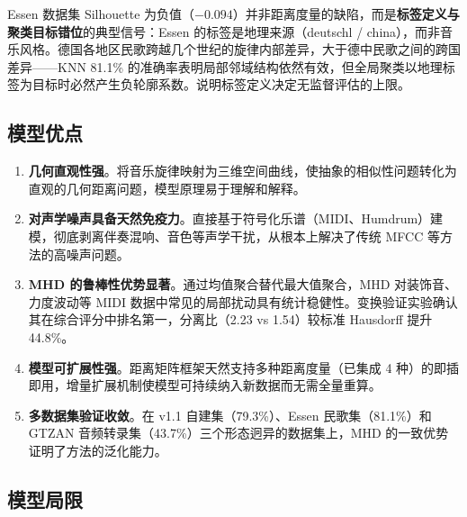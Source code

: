 \documentclass[withoutpreface]{cumcmthesis}
\begin{document}
Essen 数据集 Silhouette 为负值（$-0.094$）并非距离度量的缺陷，而是\textbf{标签定义与聚类目标错位}的典型信号：Essen 的标签是地理来源（deutschl / china），而非音乐风格。德国各地区民歌跨越几个世纪的旋律内部差异，大于德中民歌之间的跨国差异——KNN 81.1\% 的准确率表明局部邻域结构依然有效，但全局聚类以地理标签为目标时必然产生负轮廓系数。说明标签定义决定无监督评估的上限。

\subsection{模型优点}

\begin{enumerate}[label=(\arabic*),leftmargin=2em]
    \item \textbf{几何直观性强}。将音乐旋律映射为三维空间曲线，使抽象的相似性问题转化为直观的几何距离问题，模型原理易于理解和解释。
    \item \textbf{对声学噪声具备天然免疫力}。直接基于符号化乐谱（MIDI、Humdrum）建模，彻底剥离伴奏混响、音色等声学干扰，从根本上解决了传统 MFCC 等方法的高噪声问题。
    \item \textbf{MHD 的鲁棒性优势显著}。通过均值聚合替代最大值聚合，MHD 对装饰音、力度波动等 MIDI 数据中常见的局部扰动具有统计稳健性。变换验证实验确认其在综合评分中排名第一，分离比（2.23 vs 1.54）较标准 Hausdorff 提升 44.8\%。
    \item \textbf{模型可扩展性强}。距离矩阵框架天然支持多种距离度量（已集成 4 种）的即插即用，增量扩展机制使模型可持续纳入新数据而无需全量重算。
    \item \textbf{多数据集验证收敛}。在 v1.1 自建集（79.3\%）、Essen 民歌集（81.1\%）和 GTZAN 音频转录集（43.7\%）三个形态迥异的数据集上，MHD 的一致优势证明了方法的泛化能力。
\end{enumerate}

\subsection{模型局限}
\end{document}
